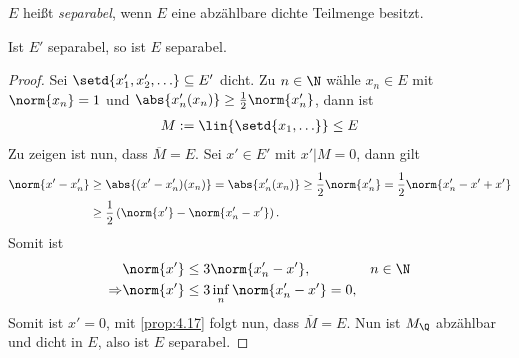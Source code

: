 \begin{defn}
\label{defn:4.28}
$E$ heißt \emph{separabel}, wenn $E$ eine abzählbare
dichte Teilmenge besitzt.~\fishhere
\end{defn}

\begin{lem}
\label{prop:4.29}
Ist $E'$ separabel, so ist $E$ separabel.\fishhere
\end{lem}
\begin{proof}
Sei $\setd{x_1',x_2',\ldots}\subseteq E'$ dicht. Zu $n\in\N$ wähle
$x_n \in E$ mit $\norm{x_n}=1$ und $\abs{x_n'(x_n)} \ge
\frac{1}{2}\norm{x_n'}$, dann ist
\begin{align*}
M:=\lin{\setd{x_1,\ldots}}\le E
\end{align*}
Zu zeigen ist nun, dass $\overline{M}=E$.
Sei $x'\in E'$ mit $x'\big|M=0$, dann gilt
\begin{align*}
\norm{x'-x_n'} &\ge \abs{(x'-x_n')(x_n)} = \abs{x_n'(x_n)}
\ge \frac{1}{2}\norm{x_n'} = \frac{1}{2}\norm{x_n'-x'+x'}\\
&\ge \frac{1}{2}\left(\norm{x'} - \norm{x_n'-x'}\right).
\end{align*}
Somit ist
\begin{align*}
&\norm{x'} \le 3\norm{x_n'-x'}, && n\in\N\\
\Rightarrow
&\norm{x'} \le 3\inf_n \norm{x_n'-x'} = 0,
\end{align*}
Somit ist $x'=0$, mit \ref{prop:4.17} folgt nun, dass $\overline{M}=E$. Nun ist
$M_\Q$ abzählbar und dicht in $E$, also ist $E$ separabel.\qedhere
\end{proof} 

